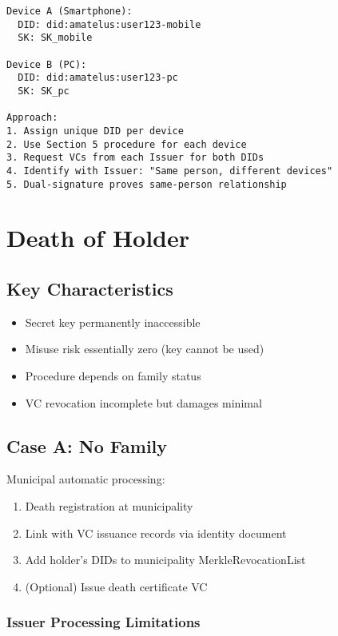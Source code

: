 \begin{verbatim}
Device A (Smartphone):
  DID: did:amatelus:user123-mobile
  SK: SK_mobile

Device B (PC):
  DID: did:amatelus:user123-pc
  SK: SK_pc

Approach:
1. Assign unique DID per device
2. Use Section 5 procedure for each device
3. Request VCs from each Issuer for both DIDs
4. Identify with Issuer: "Same person, different devices"
5. Dual-signature proves same-person relationship
\end{verbatim}

\section{Death of Holder}

\subsection{Key Characteristics}

\begin{itemize}
  \item Secret key permanently inaccessible
  \item Misuse risk essentially zero (key cannot be used)
  \item Procedure depends on family status
  \item VC revocation incomplete but damages minimal
\end{itemize}

\subsection{Case A: No Family}

Municipal automatic processing:

\begin{enumerate}
  \item Death registration at municipality
  \item Link with VC issuance records via identity document
  \item Add holder's DIDs to municipality MerkleRevocationList
  \item (Optional) Issue death certificate VC
\end{enumerate}

\subsubsection{Issuer Processing Limitations}

